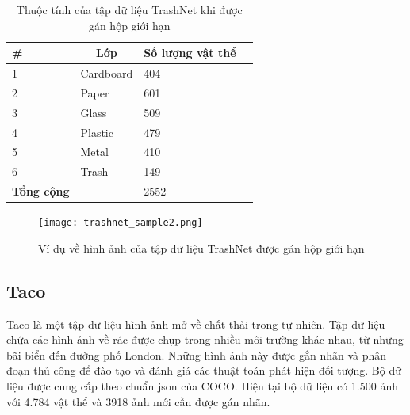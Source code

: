 \documentclass[../the.tex]{subfiles}
\begin{document}
\begin{table}[!ht]
	\centering
	\caption{Thuộc tính của tập dữ liệu TrashNet khi được gán hộp giới hạn}
	\begin{tabular}{|p{2cm}|p{4cm}|p{3.5cm}|p{2cm}|}
		\hline
		\multicolumn{1}{|l|}{
			\textbf{\#}}
		 & \multicolumn{1}{c|}{\textbf{Lớp}}
		 & \multicolumn{1}{c|}{\textbf{Số lượng vật thể}} \\
		\hline

		1
		 & Cardboard
		 & 404                                            \\
		\hline

		2
		 & Paper
		 & 601                                            \\
		\hline

		3
		 & Glass
		 & 509                                            \\
		\hline

		4
		 & Plastic
		 & 479                                            \\
		\hline

		5
		 & Metal
		 & 410                                            \\
		\hline

		6
		 & Trash
		 & 149                                            \\
		\hline


		\textbf{Tổng cộng}
		 &
		 & 2552                                           \\
		\hline
	\end{tabular}

	\label{tab:dataset1}
\end{table}


\begin{figure}[H]
	\centering
	\texttt{[image: trashnet\_sample2.png]}
	\caption{Ví dụ về hình ảnh của tập dữ liệu TrashNet được gán hộp giới hạn}
	\label{fig:dataset_1}
\end{figure}



\subsection{Taco}

{\fontsize{13}{12} \selectfont
	Taco là một tập dữ liệu hình ảnh mở về chất thải trong tự nhiên. Tập dữ liệu chứa các hình ảnh về rác được chụp trong nhiều môi trường khác nhau, từ những bãi biển đến đường phố London. Những hình ảnh này được gắn nhãn và phân đoạn thủ công để đào tạo và đánh giá các thuật toán phát hiện đối tượng.
	Bộ dữ liệu được cung cấp
	theo chuẩn json của COCO. Hiện tại bộ dữ liệu có 1.500 ảnh với 4.784 vật thể
	và 3918 ảnh mới cần được gán nhãn.
}
\end{document}
